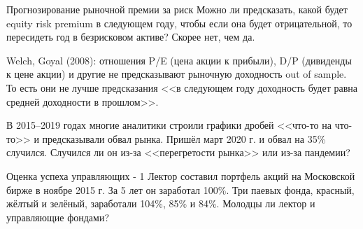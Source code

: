 \documentclass{beamer}
\begin{document}
\begin{frame}{Прогнозирование рыночной премии за риск}
\justify
Можно ли предсказать, какой будет equity risk premium в следующем году, чтобы если она будет отрицательной, то пересидеть год в безрисковом активе? Скорее нет, чем да.

\justify
Welch, Goyal (2008): отношения P/E (цена акции к прибыли), D/P (дивиденды к цене акции) и другие не предсказывают рыночную доходность out of sample. То есть они не лучше предсказания <<в следующем году доходность будет равна средней доходности в прошлом>>.

\justify
В 2015--2019 годах многие аналитики строили графики дробей <<что-то на что-то>> и предсказывали обвал рынка. Пришёл март 2020 г. и обвал на 35\% случился. Случился ли он из-за <<перегретости рынка>> или из-за пандемии?
\end{frame}



\begin{frame}{Оценка успеха управляющих - 1}
\justify
Лектор составил портфель акций на Московской бирже в ноябре 2015 г. За 5 лет он заработал 100\%. Три паевых фонда, красный, жёлтый и зелёный, заработали 104\%, 85\% и 84\%. Молодцы ли лектор и управляющие фондами?

\vspace{\baselineskip}
\end{frame}
\end{document}
